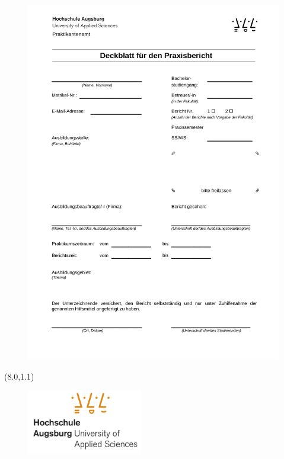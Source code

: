 \documentclass{wissdoc}
\begin{document}
	\begin{figure}[t]
			\hspace{-2.2cm}\includegraphics[width=0.93\paperwidth]{figures/deckblatt_prax_bac}
		\label{fig:deckblatt_prax_bac}
	\end{figure}  %

	\textblockorigin{20mm}{30mm}

\thispagestyle{empty}\null
\begin{textblock}{10}(8.0,1.1)
\begin{figure}[h]
	\centering
		\includegraphics[width=0.45\textwidth]{logos/hsa_informatik_logo_lq.pdf}
\end{figure}

\end{textblock}
\end{document}
